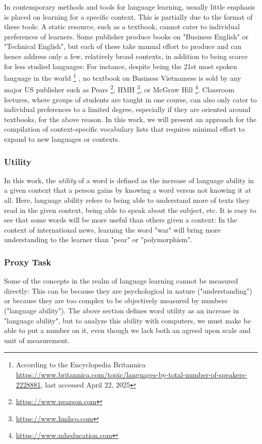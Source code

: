 In contemporary methods and tools for language learning, usually little emphasis is placed on learning for a specific context.
This is partially due to the format of these tools:
A static resource, such as a textbook, cannot cater to individual preferences of learners.
Some publisher produce books on "Business English" or "Technical English", but each of these take manual effort to produce and can hence address only a few, relatively broad contexts, in addition to being scarce for less studied languages:
For instance, despite being the 21st most spoken language in the world
\footnote{According to the Encyclopedia Britannica \url{https://www.britannica.com/topic/languages-by-total-number-of-speakers-2228881}, last accessed April 22, 2025}
, no textbook on Business Vietnamese is sold by any major US publisher such as Pears \footnote{\url{https://www.pearson.com}}, HMH \footnote{\url{https://www.hmhco.com}}, or McGraw Hill \footnote{\url{https://www.mheducation.com}}.
Classroom lectures, where groups of students are taught in one course, can also only cater to individual preferences to a limited degree, especially if they are oriented around textbooks, for the above reason.
In this work, we will present an approach for the compilation of context-specific vocabulary lists that requires minimal effort to expand to new languages or contexts.

\subsubsection{Utility} \label{sec:utility}
In this work, the \textit{utility} of a word is defined as the increase of language ability in a given context that a person gains by knowing a word versus not knowing it at all.
Here, language ability refers to being able to understand more of texts they read in the given context, being able to speak about the subject, etc.
It is easy to see that some words will be more useful than others given a context:
In the context of international news, learning the word "war" will bring more understanding to the learner than "pear" or "polymorphism".

\subsubsection{Proxy Task}
Some of the concepts in the realm of language learning cannot be measured directly:
This can be because they are psychological in nature ("understanding") or because they are too complex to be objectively measured by numbers ("language ability").
The above section defines word utility as an increase in "language ability", but to analyze this ability with computers, we must make be able to put a number on it, even though we lack both an agreed upon scale and unit of measurement.

